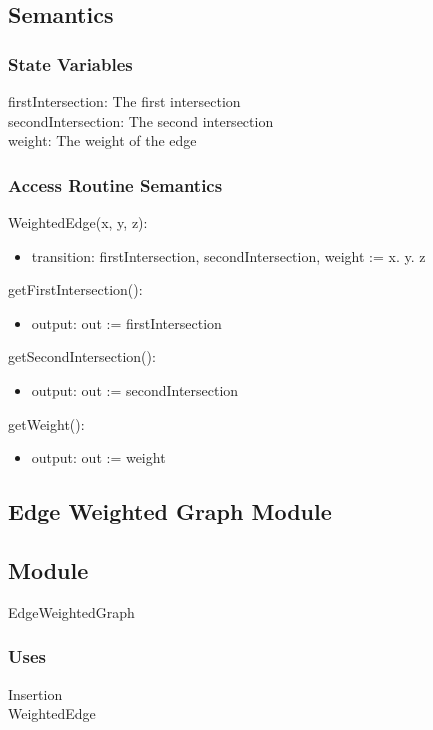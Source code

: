 \documentclass[12pt]{article}
\begin{document}
\subsection*{Semantics}
\subsubsection*{State Variables}
firstIntersection: The first intersection\\
secondIntersection: The second intersection\\
weight: The weight of the edge

\newpage
\subsubsection*{Access Routine Semantics}
\noindent WeightedEdge(x, y, z):
\begin{itemize}
    \item transition: firstIntersection, secondIntersection, weight := x. y. z
\end{itemize}

\noindent getFirstIntersection():
\begin{itemize}
    \item output: out := firstIntersection
\end{itemize}

\noindent getSecondIntersection():
\begin{itemize}
    \item output: out := secondIntersection
\end{itemize}

\noindent getWeight():
\begin{itemize}
    \item output: out := weight
\end{itemize}

\newpage
\subsection{Edge Weighted Graph Module}
\subsection*{Module}
EdgeWeightedGraph

\subsubsection*{Uses}
Insertion\\
WeightedEdge
\end{document}
